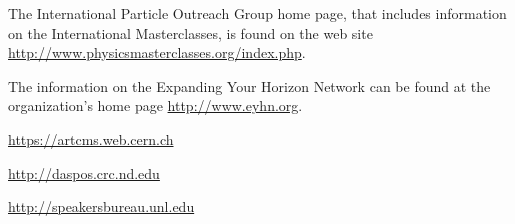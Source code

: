 \begin{thebibliography}{99}
The International Particle Outreach Group home page, that includes information on the International Masterclasses, is found on the web site \url{http://www.physicsmasterclasses.org/index.php}.

The information on the Expanding Your Horizon Network can be found at the 
organization's home page \url{http://www.eyhn.org}.


 \url{https://artcms.web.cern.ch}

\url{http://daspos.crc.nd.edu}

 \url{http://speakersbureau.unl.edu}

\end{thebibliography}




